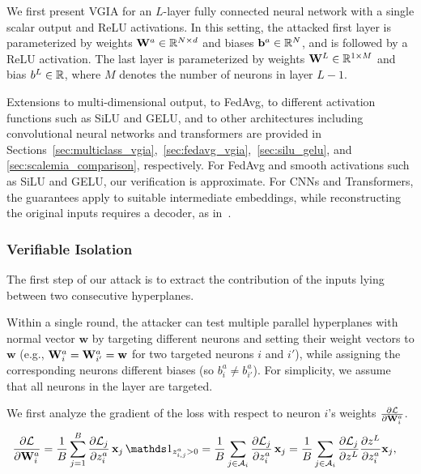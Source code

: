 We first present VGIA for an $L$-layer fully connected neural network with a single scalar output and ReLU activations. In this setting, the attacked first layer is parameterized by weights $\mathbf{W}^a \in \mathbb{R}^{N\times d}$ and biases ${\mathbf{b}}^a \in \mathbb{R}^N$, and is followed by a ReLU activation. The last layer is parameterized by weights $\mathbf{W}^L \in \mathbb{R}^{1 \times M}$ and bias $b^{L} \in \mathbb{R}$, where $M$ denotes the number of neurons in layer $L-1$.

Extensions to multi-dimensional output, to FedAvg, to different activation functions such as SiLU and GELU, and to other architectures including convolutional neural networks and transformers are provided in Sections~\ref{sec:multiclass_vgia},~\ref{sec:fedavg_vgia},~\ref{sec:silu_gelu}, and \ref{sec:scalemia_comparison}, respectively. For FedAvg and smooth activations such as SiLU and GELU, our verification is approximate. For CNNs and Transformers, the guarantees apply to suitable intermediate embeddings, while reconstructing the original inputs requires a decoder, as in~.



\subsubsection{Verifiable Isolation}
The first step of our attack is to extract the contribution of the inputs lying between two consecutive hyperplanes.

Within a single round, the attacker can test multiple parallel hyperplanes with normal vector $\mathbf w$ by targeting different neurons and setting their weight vectors to $\mathbf w$ (e.g., $\mathbf{W}_i^a=\mathbf{W}_{i'}^a=\mathbf w$ for two targeted neurons $i$ and $i'$), while assigning the corresponding neurons different biases (so $b_i^a \neq b_{i'}^a$). For simplicity, we assume that all neurons in the layer are targeted.


We first analyze the gradient of the loss with respect to neuron $i$'s weights  $\frac{\partial \mathcal{L}}{\partial \mathbf{W}_i^a}$.
\begin{align}
    \gradlosswiatt &= \frac{1}{B} \sum_{j=1}^B \frac{\partial \loss_j}{\partial z_{i}^a}\, \x_j\, \indicator_{z_{i,j}^a>0} = \frac{1}{B} \sum_{j \in \activeset_i} \frac{\partial \loss_j}{\partial z_{i}^a}\, \x_j
    =\frac{1}{B} \sum_{j \in \activeset_i}
    \frac{\partial \loss_j}{\partial z^L}\frac{\partial z^L}{\partial z_i^a}\x_j, \label{eq:weight_gradient}
\end{align}

